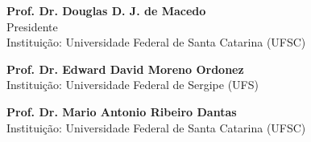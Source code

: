 \documentclass[
	12pt,				%
	oneside,			%
	a4paper,			%
	english,			%
	brazil				%
	]{abntex2ppgsi}
\begin{document}
\begin{folhadeaprovacao}
\begin{center}
%
% 
% 
%
% 
% 
% 
%
%
\textbf{Prof. Dr. Douglas D. J. de Macedo} 
\\ Presidente 
\\ Instituição: Universidade Federal de Santa Catarina (UFSC) 

\vspace*{2cm}

\textbf{Prof. Dr. Edward David Moreno Ordonez} 
\\ Instituição: Universidade Federal de Sergipe (UFS)

\vspace*{2cm}

\textbf{Prof. Dr. Mario Antonio Ribeiro Dantas} 
\\ Instituição: Universidade Federal de Santa Catarina (UFSC)

\end{center}
  
\end{folhadeaprovacao}

%
% 
\end{document}
